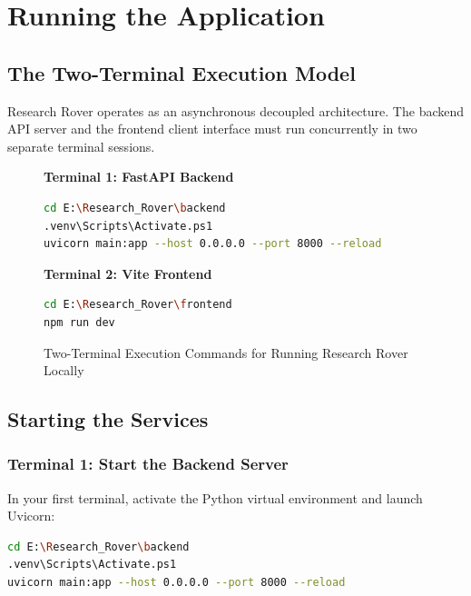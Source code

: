 \section{Running the Application}
\label{sec:execution}

\subsection{The Two-Terminal Execution Model}
Research Rover operates as an asynchronous decoupled architecture. The backend API server and the frontend client interface must run concurrently in two separate terminal sessions.

\begin{figure}[H]
\centering
\begin{minipage}{0.48\textwidth}
\textbf{Terminal 1: FastAPI Backend}
\begin{lstlisting}[language=bash]
cd E:\Research_Rover\backend
.venv\Scripts\Activate.ps1
uvicorn main:app --host 0.0.0.0 --port 8000 --reload
\end{lstlisting}
\end{minipage}
\hfill
\begin{minipage}{0.48\textwidth}
\textbf{Terminal 2: Vite Frontend}
\begin{lstlisting}[language=bash]
cd E:\Research_Rover\frontend
npm run dev
\end{lstlisting}
\end{minipage}
\caption{Two-Terminal Execution Commands for Running Research Rover Locally}
\label{fig:two_terminal_box}
\end{figure}

\subsection{Starting the Services}

\subsubsection{Terminal 1: Start the Backend Server}
In your first terminal, activate the Python virtual environment and launch Uvicorn:

\begin{lstlisting}[language=bash, caption={Launching FastAPI Backend Server}]
cd E:\Research_Rover\backend
.venv\Scripts\Activate.ps1
uvicorn main:app --host 0.0.0.0 --port 8000 --reload
\end{lstlisting}

